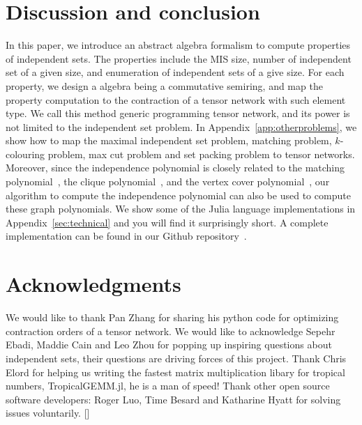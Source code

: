 \documentclass[onefignum, onetabnum]{siamart190516}
\newcommand{\<}{\langle}
\renewcommand{\>}{\rangle}
\newcommand{\App}[1]{Appendix~\ref{#1}}
\newcommand{\blue}[1]{[{\bf  \color{blue}{JG: #1}}]}
\begin{document}
\section{Discussion and conclusion}
In this paper, we introduce an abstract algebra formalism to compute properties of independent sets.
The properties include the MIS size, number of independent set of a given size, and enumeration of independent sets of a give size.
For each property, we design a algebra being a commutative semiring, and map the property computation to the contraction of a tensor network with such element type.
We call this method generic programming tensor network, and its power is not limited to the independent set problem.
In \App{app:otherproblems}, we show how to map the maximal independent set problem, matching problem, $k$-colouring problem, max cut problem and set packing problem to tensor networks.
Moreover, since the independence polynomial is closely related to the matching polynomial~\cite{Levit2005}, the clique polynomial~\cite{Hoede1994}, and the vertex cover polynomial~\cite{Akbari2013},
our algorithm to compute the independence polynomial can also be used to compute these graph polynomials.
We show some of the Julia language implementations in Appendix~\ref{sec:technical} and you will find it surprisingly short.
A complete implementation can be found in our Github repository~\cite{GraphTensorNetworks}.

\section*{Acknowledgments}
We would like to thank Pan Zhang for sharing his python code for optimizing contraction orders of a tensor network.
We would like to acknowledge Sepehr Ebadi, Maddie Cain and Leo Zhou for popping up inspiring questions about independent sets,
their questions are driving forces of this project.
Thank Chris Elord for helping us writing the fastest matrix multiplication libary for tropical numbers, TropicalGEMM.jl, he is a man of speed!
Thank other open source software developers: Roger Luo, Time Besard and Katharine Hyatt for solving issues voluntarily.
\blue{funding information}
\end{document}
